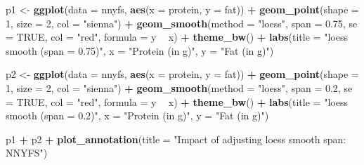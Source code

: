 \documentclass[
]{book}
\newenvironment{Shaded}{\begin{snugshade}}{\end{snugshade}}
\newcommand{\DataTypeTok}[1]{\textcolor[rgb]{0.13,0.29,0.53}{#1}}
\newcommand{\DecValTok}[1]{\textcolor[rgb]{0.00,0.00,0.81}{#1}}
\newcommand{\FloatTok}[1]{\textcolor[rgb]{0.00,0.00,0.81}{#1}}
\newcommand{\KeywordTok}[1]{\textcolor[rgb]{0.13,0.29,0.53}{\textbf{#1}}}
\newcommand{\NormalTok}[1]{#1}
\newcommand{\OperatorTok}[1]{\textcolor[rgb]{0.81,0.36,0.00}{\textbf{#1}}}
\newcommand{\OtherTok}[1]{\textcolor[rgb]{0.56,0.35,0.01}{#1}}
\newcommand{\StringTok}[1]{\textcolor[rgb]{0.31,0.60,0.02}{#1}}
\begin{document}
\begin{Shaded}
\begin{Highlighting}[]
\NormalTok{p1 <-}\StringTok{ }\KeywordTok{ggplot}\NormalTok{(}\DataTypeTok{data =}\NormalTok{ nnyfs, }\KeywordTok{aes}\NormalTok{(}\DataTypeTok{x =}\NormalTok{ protein, }\DataTypeTok{y =}\NormalTok{ fat)) }\OperatorTok{+}
\StringTok{    }\KeywordTok{geom_point}\NormalTok{(}\DataTypeTok{shape =} \DecValTok{1}\NormalTok{, }\DataTypeTok{size =} \DecValTok{2}\NormalTok{, }\DataTypeTok{col =} \StringTok{"sienna"}\NormalTok{) }\OperatorTok{+}
\StringTok{    }\KeywordTok{geom_smooth}\NormalTok{(}\DataTypeTok{method =} \StringTok{"loess"}\NormalTok{, }\DataTypeTok{span =} \FloatTok{0.75}\NormalTok{, }\DataTypeTok{se =} \OtherTok{TRUE}\NormalTok{, }
                \DataTypeTok{col =} \StringTok{"red"}\NormalTok{, }\DataTypeTok{formula =}\NormalTok{ y }\OperatorTok{~}\StringTok{ }\NormalTok{x) }\OperatorTok{+}
\StringTok{    }\KeywordTok{theme_bw}\NormalTok{() }\OperatorTok{+}
\StringTok{    }\KeywordTok{labs}\NormalTok{(}\DataTypeTok{title =} \StringTok{"loess smooth (span = 0.75)"}\NormalTok{,}
         \DataTypeTok{x =} \StringTok{"Protein (in g)"}\NormalTok{, }\DataTypeTok{y =} \StringTok{"Fat (in g)"}\NormalTok{)}

\NormalTok{p2 <-}\StringTok{ }\KeywordTok{ggplot}\NormalTok{(}\DataTypeTok{data =}\NormalTok{ nnyfs, }\KeywordTok{aes}\NormalTok{(}\DataTypeTok{x =}\NormalTok{ protein, }\DataTypeTok{y =}\NormalTok{ fat)) }\OperatorTok{+}
\StringTok{    }\KeywordTok{geom_point}\NormalTok{(}\DataTypeTok{shape =} \DecValTok{1}\NormalTok{, }\DataTypeTok{size =} \DecValTok{2}\NormalTok{, }\DataTypeTok{col =} \StringTok{"sienna"}\NormalTok{) }\OperatorTok{+}
\StringTok{    }\KeywordTok{geom_smooth}\NormalTok{(}\DataTypeTok{method =} \StringTok{"loess"}\NormalTok{, }\DataTypeTok{span =} \FloatTok{0.2}\NormalTok{, }\DataTypeTok{se =} \OtherTok{TRUE}\NormalTok{, }
                \DataTypeTok{col =} \StringTok{"red"}\NormalTok{, }\DataTypeTok{formula =}\NormalTok{ y }\OperatorTok{~}\StringTok{ }\NormalTok{x) }\OperatorTok{+}
\StringTok{    }\KeywordTok{theme_bw}\NormalTok{() }\OperatorTok{+}
\StringTok{    }\KeywordTok{labs}\NormalTok{(}\DataTypeTok{title =} \StringTok{"loess smooth (span = 0.2)"}\NormalTok{,}
         \DataTypeTok{x =} \StringTok{"Protein (in g)"}\NormalTok{, }\DataTypeTok{y =} \StringTok{"Fat (in g)"}\NormalTok{)}

\NormalTok{p1 }\OperatorTok{+}\StringTok{ }\NormalTok{p2 }\OperatorTok{+}\StringTok{ }
\StringTok{    }\KeywordTok{plot_annotation}\NormalTok{(}\DataTypeTok{title =} \StringTok{"Impact of adjusting loess smooth span: NNYFS"}\NormalTok{)}
\end{Highlighting}
\end{Shaded}
\end{document}
